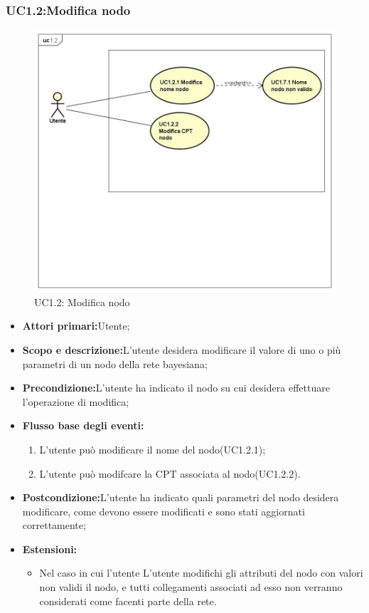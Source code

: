 \subsubsection{UC1.2:Modifica nodo}
\begin{figure} [H]
	\centering
	\includegraphics[scale=0.45]{Img/UC1-2}
	\caption{UC1.2: Modifica nodo}\label{}
\end{figure}
\begin{itemize}
	\item{\textbf{Attori primari:}Utente;}
	\item{\textbf{Scopo e descrizione:}L'utente desidera modificare il valore di uno o più parametri di un nodo della rete bayesiana;}
	\item{\textbf{Precondizione:}L'utente ha indicato il nodo su cui desidera effettuare l'operazione di modifica;}
	\item{\textbf{Flusso base degli eventi:}}
		\begin{enumerate}
			\item{L'utente può modificare il nome del nodo(UC1.2.1);}
			\item{L'utente può modifcare la CPT associata al nodo(UC1.2.2).}		
		\end{enumerate}
	\item{\textbf{Postcondizione:}L'utente ha indicato quali parametri del nodo desidera modificare, come devono essere modificati e sono stati aggiornati correttamente;}
	\item{\textbf{Estensioni:}}
		\begin{itemize}
			\item{Nel caso in cui l'utente L'utente modifichi gli attributi del nodo con valori non validi il nodo, e tutti collegamenti associati ad esso non verranno considerati come facenti parte della rete.}
		\end{itemize}
\end{itemize}
